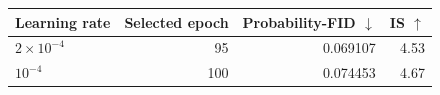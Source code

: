 \begin{tabular}{lrrr}
\toprule
Learning rate & Selected epoch & Probability-FID $\downarrow$ & IS $\uparrow$ \\
\midrule
$2\times10^{-4}$ & 95 & 0.069107 & 4.53 \\
$10^{-4}$ & 100 & 0.074453 & 4.67 \\
\bottomrule
\end{tabular}

